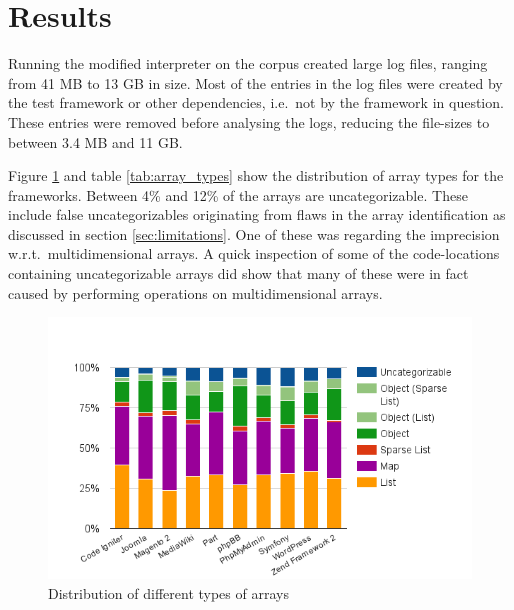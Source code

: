\section{Results}
\label{sec:analysisResults}
Running the modified interpreter on the corpus created large log files, ranging from 41 MB to 13 GB in size. Most of the entries in the log files were created by the test framework or other dependencies, i.e.\ not by the framework in question. These entries were removed before analysing the logs, reducing the file-sizes to between 3.4 MB and 11 GB.

Figure \ref{fig:array_types} and table \ref{tab:array_types} show the distribution of array types for the frameworks.  Between 4\% and 12\% of the arrays are uncategorizable. These include false uncategorizables originating from flaws in the array identification as discussed in section \ref{sec:limitations}. One of these was regarding the imprecision w.r.t.\ multidimensional arrays. A quick inspection of some of the code-locations containing uncategorizable arrays did show that many of these were in fact caused by performing operations on multidimensional arrays.

\begin{figure}
\centering
\includegraphics[width=\textwidth]{chapters/study/g22.png}
\caption{Distribution of different types of arrays}
\label{fig:array_types}
\end{figure}

